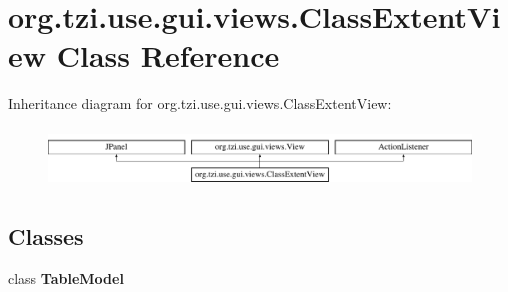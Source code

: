 \hypertarget{classorg_1_1tzi_1_1use_1_1gui_1_1views_1_1_class_extent_view}{\section{org.\-tzi.\-use.\-gui.\-views.\-Class\-Extent\-View Class Reference}
\label{classorg_1_1tzi_1_1use_1_1gui_1_1views_1_1_class_extent_view}
}
Inheritance diagram for org.\-tzi.\-use.\-gui.\-views.\-Class\-Extent\-View\-:\begin{figure}[H]
\begin{center}
\leavevmode
\includegraphics[height=1.602289cm]{classorg_1_1tzi_1_1use_1_1gui_1_1views_1_1_class_extent_view}
\end{center}
\end{figure}
\subsection*{Classes}
\begin{DoxyCompactItemize}
\item 
class {\bfseries Table\-Model}
\end{DoxyCompactItemize}
